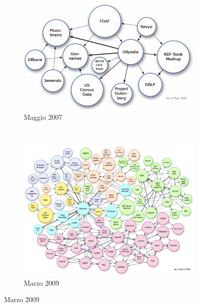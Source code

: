 \begin{figure}
    \centering
    \begin{subfigure}[b]{0.5\textwidth}
            \includegraphics[width=\textwidth]{images/lod-cloud-2007.png}
            \caption{Maggio 2007}
            \label{fig:lod-cloud-2007}
    \end{subfigure}%
    ~ %
    \begin{subfigure}[b]{0.5\textwidth}
            \includegraphics[width=\textwidth]{images/lod-cloud-2009.png}
            \caption{Marzo 2009}
            \label{fig:lod-cloud-2009}
    \end{subfigure}


\end{figure}
